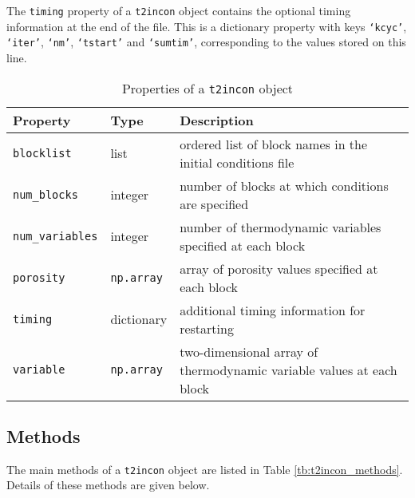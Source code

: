 The \texttt{timing} property of a \texttt{t2incon} object contains the optional timing information at the end of the file.  This is a dictionary property with keys \texttt{`kcyc'}, \texttt{`iter'}, \texttt{`nm'}, \texttt{`tstart'} and \texttt{`sumtim'}, corresponding to the values stored on this line.

\begin{table}
  \begin{center}
    \begin{tabular}{|l|l|p{75mm}|}
      \hline
      \textbf{Property} & \textbf{Type} & \textbf{Description}\\
      \hline
      \texttt{blocklist} & list & ordered list of block names in the initial conditions file\\
      \texttt{num\_blocks} & integer & number of blocks at which conditions are specified \\
      \texttt{num\_variables} & integer & number of thermodynamic variables specified at each block\\
      \texttt{porosity} & \texttt{np.array} & array of porosity values specified at each block\\
      \texttt{timing} & dictionary & additional timing information for restarting\\
      \texttt{variable} & \texttt{np.array} & two-dimensional array of thermodynamic variable values at each block\\
      \hline
    \end{tabular}
    \caption{Properties of a \texttt{t2incon} object}
    \label{tb:t2incon_properties}
  \end{center}
\end{table}

\subsection{Methods}

The main methods of a \texttt{t2incon} object are listed in Table \ref{tb:t2incon_methods}.  Details of these methods are given below.

